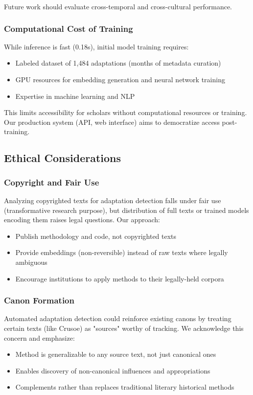 \documentclass[12pt,a4paper]{article}
\begin{document}
Future work should evaluate cross-temporal and cross-cultural performance.

\subsubsection{Computational Cost of Training}

While inference is fast (0.18s), initial model training requires:
\begin{itemize}
    \item Labeled dataset of 1,484 adaptations (months of metadata curation)
    \item GPU resources for embedding generation and neural network training
    \item Expertise in machine learning and NLP
\end{itemize}

This limits accessibility for scholars without computational resources or training. Our production system (API, web interface) aims to democratize access post-training.

\subsection{Ethical Considerations}

\subsubsection{Copyright and Fair Use}

Analyzing copyrighted texts for adaptation detection falls under fair use (transformative research purpose), but distribution of full texts or trained models encoding them raises legal questions. Our approach:
\begin{itemize}
    \item Publish methodology and code, not copyrighted texts
    \item Provide embeddings (non-reversible) instead of raw texts where legally ambiguous
    \item Encourage institutions to apply methods to their legally-held corpora
\end{itemize}

\subsubsection{Canon Formation}

Automated adaptation detection could reinforce existing canons by treating certain texts (like Crusoe) as "sources" worthy of tracking. We acknowledge this concern and emphasize:
\begin{itemize}
    \item Method is generalizable to any source text, not just canonical ones
    \item Enables discovery of non-canonical influences and appropriations
    \item Complements rather than replaces traditional literary historical methods
\end{itemize}
\end{document}
